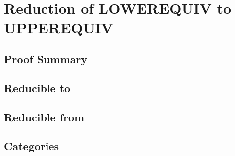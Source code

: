 \documentclass{article}
\begin{document}

\section{Reduction of LOWEREQUIV to UPPEREQUIV}

\subsection{Proof Summary}


\subsection{Reducible to}

\subsection{Reducible from}

\subsection{Categories}
\end{document}
